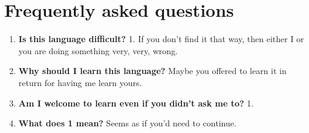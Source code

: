 \chapter{Frequently asked questions}

\newcommand{\qa}[2]{\item \textbf{#1} #2}

\begin{enumerate}
  \qa{Is this language difficult?}{1. If you don't find it that way, then either I or you are doing something very, very, wrong.}
  \qa{Why should I learn this language?}{Maybe you offered to learn it in return for having me learn yours.}
  \qa{Am I welcome to learn even if you didn't ask me to?}{1.}
  \qa{What does 1 mean?}{Seems as if you'd need to continue.}
\end{enumerate}
